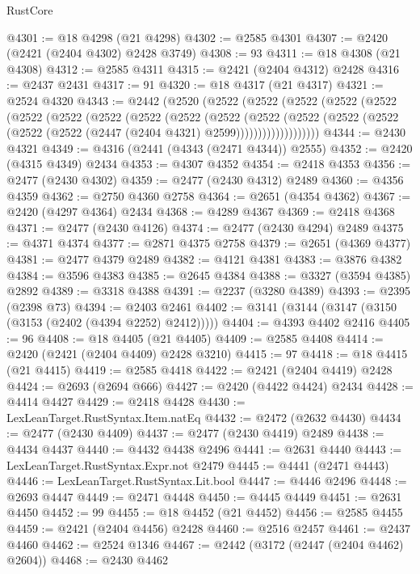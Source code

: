 \begin{lexlean}{RustCore}
\begin{coremodule}
@4301 := @18 @4298 (@21 @4298)
@4302 := @2585 @4301
@4307 := @2420 (@2421 (@2404 @4302) @2428 @3749)
@4308 := 93
@4311 := @18 @4308 (@21 @4308)
@4312 := @2585 @4311
@4315 := @2421 (@2404 @4312) @2428
@4316 := @2437 @2431
@4317 := 91
@4320 := @18 @4317 (@21 @4317)
@4321 := @2524 @4320
@4343 := @2442
    (@2520
      (@2522
        (@2522
          (@2522
            (@2522
              (@2522
                (@2522
                  (@2522
                    (@2522
                      (@2522
                        (@2522
                          (@2522
                            (@2522
                              (@2522
                                (@2522
                                  (@2522 (@2522 (@2522 (@2447 (@2404 @4321) @2599)))))))))))))))))))
@4344 := @2430 @4321
@4349 := @4316 (@2441 (@4343 (@2471 @4344)) @2555)
@4352 := @2420 (@4315 @4349) @2434
@4353 := @4307 @4352
@4354 := @2418 @4353
@4356 := @2477 (@2430 @4302)
@4359 := @2477 (@2430 @4312) @2489
@4360 := @4356 @4359
@4362 := @2750 @4360 @2758
@4364 := @2651 (@4354 @4362)
@4367 := @2420 (@4297 @4364) @2434
@4368 := @4289 @4367
@4369 := @2418 @4368
@4371 := @2477 (@2430 @4126)
@4374 := @2477 (@2430 @4294) @2489
@4375 := @4371 @4374
@4377 := @2871 @4375 @2758
@4379 := @2651 (@4369 @4377)
@4381 := @2477 @4379 @2489
@4382 := @4121 @4381
@4383 := @3876 @4382
@4384 := @3596 @4383
@4385 := @2645 @4384
@4388 := @3327 (@3594 @4385) @2892
@4389 := @3318 @4388
@4391 := @2237 (@3280 @4389)
@4393 := @2395 (@2398 @73)
@4394 := @2403 @2461
@4402 := @3141 (@3144 (@3147 (@3150 (@3153 (@2402 (@4394 @2252) @2412)))))
@4404 := @4393 @4402 @2416
@4405 := 96
@4408 := @18 @4405 (@21 @4405)
@4409 := @2585 @4408
@4414 := @2420 (@2421 (@2404 @4409) @2428 @3210)
@4415 := 97
@4418 := @18 @4415 (@21 @4415)
@4419 := @2585 @4418
@4422 := @2421 (@2404 @4419) @2428
@4424 := @2693 (@2694 @666)
@4427 := @2420 (@4422 @4424) @2434
@4428 := @4414 @4427
@4429 := @2418 @4428
@4430 := LexLeanTarget.RustSyntax.Item.natEq
@4432 := @2472 (@2632 @4430)
@4434 := @2477 (@2430 @4409)
@4437 := @2477 (@2430 @4419) @2489
@4438 := @4434 @4437
@4440 := @4432 @4438 @2496
@4441 := @2631 @4440
@4443 := LexLeanTarget.RustSyntax.Expr.not @2479
@4445 := @4441 (@2471 @4443)
@4446 := LexLeanTarget.RustSyntax.Lit.bool
@4447 := @4446 @2496
@4448 := @2693 @4447
@4449 := @2471 @4448
@4450 := @4445 @4449
@4451 := @2631 @4450
@4452 := 99
@4455 := @18 @4452 (@21 @4452)
@4456 := @2585 @4455
@4459 := @2421 (@2404 @4456) @2428
@4460 := @2516 @2457
@4461 := @2437 @4460
@4462 := @2524 @1346
@4467 := @2442 (@3172 (@2447 (@2404 @4462) @2604))
@4468 := @2430 @4462

\end{coremodule}
\end{lexlean}
